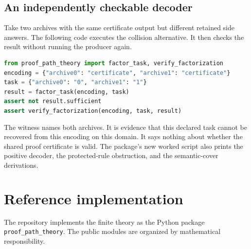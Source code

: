 \subsection{An independently checkable decoder}

Take two archives with the same certificate output but different retained side answers. The following code executes the collision alternative. It then checks the result without running the producer again.
\begin{lstlisting}[language=Python]
from proof_path_theory import factor_task, verify_factorization
encoding = {"archive0": "certificate", "archive1": "certificate"}
task = {"archive0": "0", "archive1": "1"}
result = factor_task(encoding, task)
assert not result.sufficient
assert verify_factorization(encoding, task, result)
\end{lstlisting}
The witness names both archives. It is evidence that this declared task cannot be recovered from this encoding on this domain. It says nothing about whether the shared proof certificate is valid. The package's new worked script also prints the positive decoder, the protected-rule obstruction, and the semantic-cover derivations.

\section{Reference implementation}
\label{PPT:sec:old21}

The repository implements the finite theory as the Python package \texttt{proof\_path\_theory}. The public modules are organized by mathematical responsibility.


